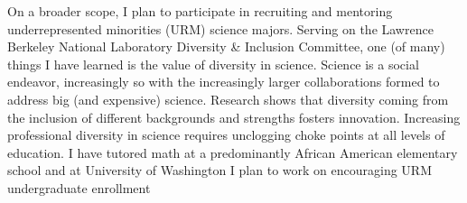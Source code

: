 \documentclass[12pt]{article}
\newcommand{\where}{University of Washington}
\newcommand{\where}{University of Michigan}
\begin{document}
On a broader scope, I plan to participate in recruiting and mentoring underrepresented minorities (URM) science majors.
Serving on the Lawrence Berkeley National Laboratory Diversity \& Inclusion Committee, one (of many) things I have
learned is the value of diversity in science.  Science is a social endeavor, increasingly so with
the increasingly larger collaborations formed to address big (and expensive) science.  Research shows that diversity
coming  from the inclusion of different  backgrounds and strengths fosters innovation.  Increasing professional
diversity in science requires
unclogging choke points at all levels of education.  I have tutored math at a predominantly African American
elementary school and at  \where{} I plan to work on encouraging URM undergraduate enrollment  \iftoggle{UW}{through the
Office of Minority Affairs \& Diversity Recruitment and Outreach.}{as a
mentor in the Michigan Louis Stokes Alliance for Minority Participation.}
\end{document}
